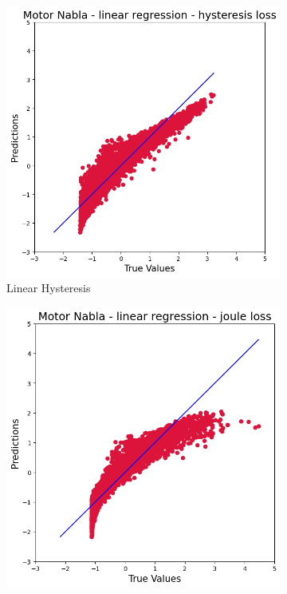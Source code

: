 \documentclass{article}
\begin{document}
\begin{figure}[!htbp]
    \centering
    \begin{subfigure}[b]{0.23\textwidth}
        \centering
        \includegraphics[width=\textwidth]{images/Nabla/linear_hysteresis.png}
        \caption{Linear Hysteresis}
    \end{subfigure}
    \hfill
    \begin{subfigure}[b]{0.23\textwidth}
        \centering
        \includegraphics[width=\textwidth]{images/Nabla/linear_joule.png}

\end{subfigure}
\end{figure}
\end{document}

